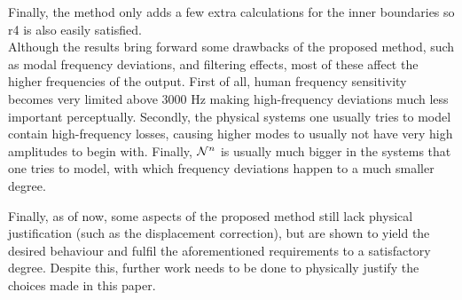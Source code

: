 Finally, the method only adds a few extra calculations for the inner boundaries so r4 is also easily satisfied. 
\\

Although the results bring forward some drawbacks of the proposed method, such as modal frequency deviations, and filtering effects, most of these affect the higher frequencies of the output. First of all, human frequency sensitivity becomes very limited above 3000 Hz \cite{Zwicker1990} making high-frequency deviations much less important perceptually. Secondly, the physical systems one usually tries to model contain high-frequency losses, causing higher modes to usually not have very high amplitudes to begin with. Finally, $\mathcal{N}^n$ is usually much bigger in the systems that one tries to model, with which frequency deviations happen to a much smaller degree. 

Finally, as of now, some aspects of the proposed method still lack physical justification (such as the displacement correction), but are shown to yield the desired behaviour and fulfil the aforementioned requirements to a satisfactory degree. Despite this, further work needs to be done to physically justify the choices made in this paper.


